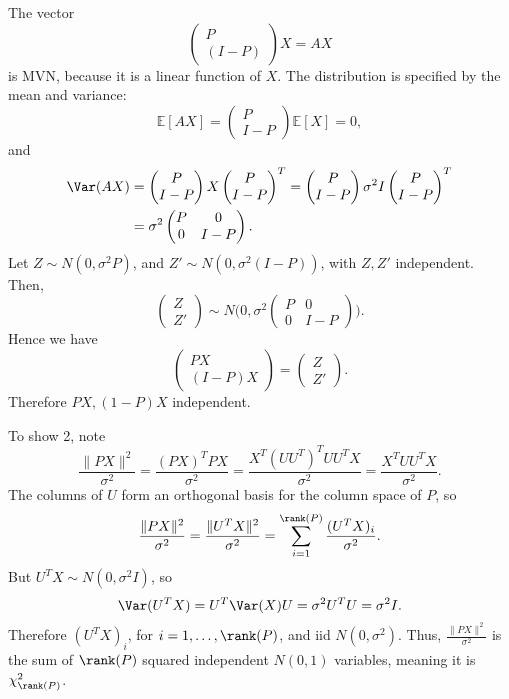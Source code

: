 \documentclass[12pt]{article}
\begin{document}
\begin{proofbox}
	The vector
	\[
	\begin{pmatrix}
		P \\ (I-P)
	\end{pmatrix}
	X = AX
	\]
	is MVN, because it is a linear function of $X$. The distribution is specified by the mean and variance:
	\[
	\mathbb{E}[AX] =
	\begin{pmatrix}
		P \\ I-P
	\end{pmatrix}
	\mathbb{E}[X] = 0,
	\]
	and
	\begin{align*}
		\Var(AX) &=
	\begin{pmatrix}
		P \\ I-P
	\end{pmatrix}
	X
	\begin{pmatrix}
		P \\ I-P
	\end{pmatrix}^{T}
	=
	\begin{pmatrix}
		P \\ I-P
	\end{pmatrix}
	\sigma^2 I
	\begin{pmatrix}
		P \\ I-P
	\end{pmatrix}^{T}
	\\
			 &= \sigma^2
	\begin{pmatrix}
		P & 0 \\ 0 & I-P
	\end{pmatrix}.
	\end{align*}
	Let $Z \sim N(0, \sigma^2P)$, and $Z' \sim N(0, \sigma^2(I-P))$, with $Z, Z'$ independent. Then,
	\[
	\begin{pmatrix}
		Z \\ Z'
	\end{pmatrix}
	\sim
	N \Biggl( 0, \sigma^2
		\begin{pmatrix}
			P & 0 \\ 0 & I-P
		\end{pmatrix}\biggr).
	\]
	Hence we have
	\[
	\begin{pmatrix}
		PX \\ (I-P)X
	\end{pmatrix}
	=
	\begin{pmatrix}
		Z \\ Z'
	\end{pmatrix}.
	\]
	Therefore $PX, (1-P)X$ independent.

	To show 2, note
	\[
	\frac{\|PX\|^2}{\sigma^2} = \frac{(PX)^{T}PX}{\sigma^2} = \frac{X^{T}(UU^{T})^{T}UU^{T}X}{\sigma^2} = \frac{X^{T}UU^{T}X}{\sigma^2}.
	\]
	The columns of $U$ form an orthogonal basis for the column space of $P$, so
	\[
	\frac{\|PX\|^2}{\sigma^2} = \frac{\|U^{T}X\|^2}{\sigma^2} = \sum_{i = 1}^{\rank(P)} \frac{(U^{T}X)_i}{\sigma^2}.
	\]
	But $U^{T}X \sim N(0, \sigma^2I)$, so
	\[
	\Var(U^{T}X) = U^{T}\Var(X) U = \sigma^2 U^{T}U = \sigma^2 I.
	\]
	Therefore $(U^{T}X)_i$, for $i = 1, \ldots, \rank(P)$, and iid $N(0, \sigma^2)$. Thus, $\frac{\|PX\|^2}{\sigma^2}$ is the sum of $\rank(P)$ squared independent $N(0,1)$ variables, meaning it is $\chi_{\rank(P)}^2$.
\end{proofbox}
\end{document}

